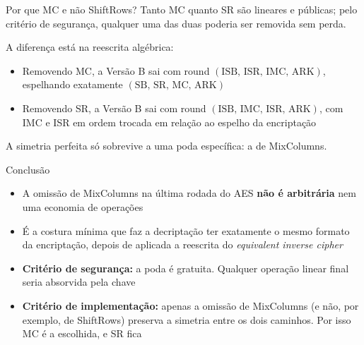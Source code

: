 \documentclass{beamer}
\begin{document}
\begin{frame}{Por que MC e não ShiftRows?}
Tanto MC quanto SR são lineares e públicas; pelo critério de segurança, qualquer uma das duas poderia ser removida sem perda.

\bigskip
A diferença está na reescrita algébrica:

\begin{itemize}
    \item Removendo MC, a Versão B sai com round $(\text{ISB, ISR, IMC, ARK})$, espelhando exatamente $(\text{SB, SR, MC, ARK})$
    \item Removendo SR, a Versão B sai com round $(\text{ISB, IMC, ISR, ARK})$, com IMC e ISR em ordem trocada em relação ao espelho da encriptação
\end{itemize}

\bigskip
A simetria perfeita só sobrevive a uma poda específica: a de MixColumns.
\end{frame}

\begin{frame}{Conclusão}
\begin{itemize}
    \item A omissão de MixColumns na última rodada do AES \textbf{não é arbitrária} nem uma economia de operações
    \medskip
    \item É a costura mínima que faz a decriptação ter exatamente o mesmo formato da encriptação, depois de aplicada a reescrita do \textit{equivalent inverse cipher}
    \medskip
    \item \textbf{Critério de segurança:} a poda é gratuita. Qualquer operação linear final seria absorvida pela chave
    \medskip
    \item \textbf{Critério de implementação:} apenas a omissão de MixColumns (e não, por exemplo, de ShiftRows) preserva a simetria entre os dois caminhos. Por isso MC é a escolhida, e SR fica
\end{itemize}
\end{frame}
\end{document}
